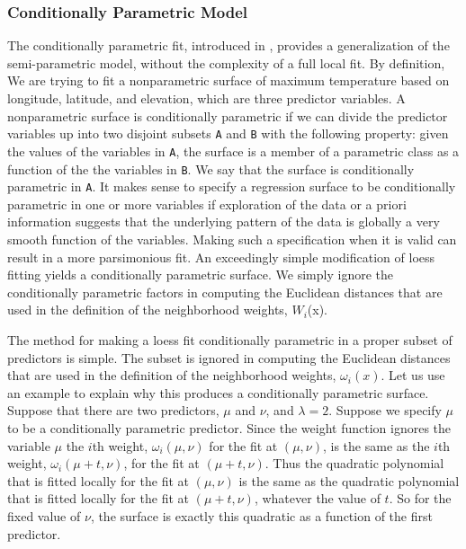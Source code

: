 \subsubsection{Conditionally Parametric Model}

The conditionally parametric fit, introduced in \cite{cleveland1992local}, provides
a generalization of the semi-parametric model, without the complexity of a full
local fit. By definition, We are trying to fit a nonparametric surface of maximum 
temperature based on longitude, latitude, and elevation, which are three predictor
variables. A nonparametric surface is conditionally parametric if we can divide
the predictor variables up into two disjoint subsets \texttt{A} and \texttt{B} 
with the following property: given the values of the variables in \texttt{A},
the surface is a member of a parametric class as a function of the the variables
in \texttt{B}. We say that the surface is conditionally parametric in \texttt{A}.
It makes sense to specify a regression surface to be conditionally parametric
in one or more variables if exploration of the data or a priori information
suggests that the underlying pattern of the data is globally a very smooth
function of the variables. Making such a specification when it is valid can
result in a more parsimonious fit.
An exceedingly simple modification of loess fitting yields a conditionally
parametric surface. We simply ignore the conditionally parametric factors
in computing the Euclidean distances that are used in the definition of the
neighborhood weights, $W_i$(x).

The method for making a loess fit conditionally parametric in a proper subset of
predictors is simple. The subset is ignored in computing the Euclidean distances 
that are used in the definition of the neighborhood weights, $\omega_i(x)$. Let 
us use an example to explain why this produces a conditionally parametric surface. 
Suppose that there are two predictors, $\mu$ and $\nu$, and $\lambda=2$. Suppose 
we specify $\mu$ to be a conditionally parametric predictor. Since the weight 
function ignores the variable $\mu$ the $i$th weight, $\omega_i(\mu, \nu)$ for 
the fit at $(\mu, \nu)$, is the same as the $i$th weight, $\omega_i(\mu+t, \nu)$, 
for the fit at $(\mu+t, \nu)$. Thus the quadratic polynomial that is fitted locally 
for the fit at $(\mu, \nu)$ is the same as the quadratic polynomial that is fitted 
locally for the fit at $(\mu+t, \nu)$, whatever the value of $t$. So for the fixed 
value of $\nu$, the surface is exactly this quadratic as a function of the first 
predictor.

